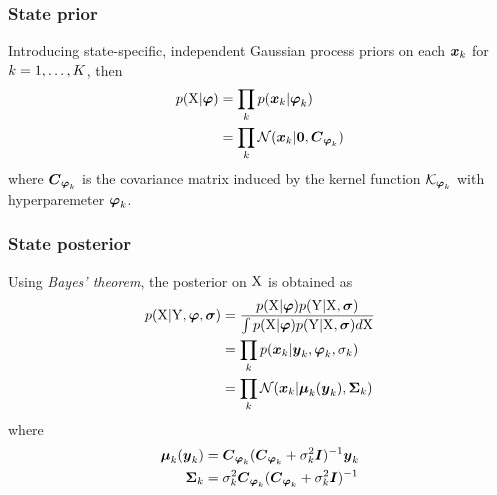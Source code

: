 \begin{frame}[t]
    \frametitle{State prior}
    Introducing state-specific, independent Gaussian process priors on each $\boldsymbol{x}_{k}$ for $k = 1,\dots,K$, then
    \begin{align}
        p(\mathrm{X}\vert\boldsymbol{\varphi}) 
        & = 
        \prod_k{
            p(\boldsymbol{x}_{k}\vert\boldsymbol{\varphi}_{k})
        }
        \nonumber
        \\
        & = 
        \prod_k{
            \mathcal{N}(
            \boldsymbol{x}_{k}\vert\boldsymbol{0}, \boldsymbol{C}_{\boldsymbol{\varphi}_{k}})
        }
        \label{eq-gmgp-x-prior}
    \end{align}
    where $\boldsymbol{C}_{\boldsymbol{\varphi}_{k}}$ is the covariance matrix induced by the kernel function $\mathcal{K}_{\boldsymbol{\varphi}_{k}}$ with hyperparemeter $\boldsymbol{\varphi}_{k}$.
\end{frame}

\begin{frame}[t]
    \frametitle{State posterior}
    Using \emph{Bayes' theorem}, the posterior on $\mathrm{X}$ is obtained as
    \begin{align}
        p(\mathrm{X}\vert\mathrm{Y},\boldsymbol{\varphi},\boldsymbol{\sigma}) 
        & = 
        \frac{
            p(\mathrm{X}\vert\boldsymbol{\varphi})p(\mathrm{Y}\vert\mathrm{X},\boldsymbol{\sigma})}{
            \int{
                p(\mathrm{X}\vert\boldsymbol{\ensuremath{\varphi}})p(\mathrm{Y}\vert\mathrm{X},\boldsymbol{\sigma})d{\mathrm{X}}}
        }
        \nonumber
        \\
        & = 
        \prod_k{
            p(\boldsymbol{x}_{k}\vert\boldsymbol{y}_{k},\boldsymbol{\varphi}_{k},\sigma_{k})
        }
        \nonumber
        \\
        & = 
        \prod_k{
            \mathcal{N}(
            \boldsymbol{x}_{k}\vert\boldsymbol{\mu}_{k}(\boldsymbol{y}_{k}), \boldsymbol{\Sigma}_{k})
        }
        \label{eq-gmgp-x-posterior}
    \end{align}
    where
    \begin{align}
        \boldsymbol{\mu}_{k}(\boldsymbol{y}_{k}) &= \boldsymbol{C}_{\boldsymbol{\varphi}_{k}}(\boldsymbol{C}_{\boldsymbol{\varphi}_{k}} + \sigma_{k}^2\boldsymbol{I})^{-1}\boldsymbol{y}_{k}
        \nonumber
        \\        
        \boldsymbol{\Sigma}_{k} &= \sigma_{k}^2\boldsymbol{C}_{\boldsymbol{\varphi}_{k}}(\boldsymbol{C}_{\boldsymbol{\varphi}_{k}} + \sigma_{k}^2\boldsymbol{I})^{-1}
        \nonumber
    \end{align}    
\end{frame}

